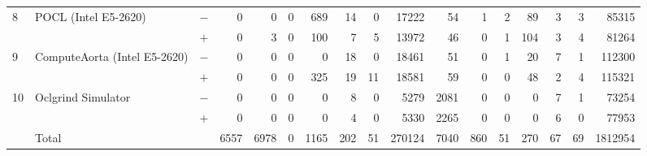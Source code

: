 \begin{tabular}{lll | rrrrrrr | rrrrrrr }
\hline
\multirow{ 2}{*}{8} & \multirow{ 2}{*}{POCL (Intel E5-2620)} & $-$ & 0 & 0 & 0 & 689 & 14 & 0 & 17222       & 54 & 1 & 2 & 89 & 3 & 3 & 85315 \\& & $+$ & 0 & 3 & 0 & 100 & 7 & 5 & 13972 & 46 & 0 & 1 & 104 & 3 & 4 & 81264 \\
\hline
\multirow{ 2}{*}{9} & \multirow{ 2}{*}{ComputeAorta (Intel E5-2620)} & $-$ & 0 & 0 & 0 & 0 & 18 & 0 & 18461       & 51 & 0 & 1 & 20 & 7 & 1 & 112300 \\& & $+$ & 0 & 0 & 0 & 325 & 19 & 11 & 18581 & 59 & 0 & 0 & 48 & 2 & 4 & 115321 \\
\hline
\multirow{ 2}{*}{10} & \multirow{ 2}{*}{Oclgrind Simulator} & $-$ & 0 & 0 & 0 & 0 & 8 & 0 & 5279       & 2081 & 0 & 0 & 0 & 7 & 1 & 73254 \\& & $+$ & 0 & 0 & 0 & 0 & 4 & 0 & 5330 & 2265 & 0 & 0 & 0 & 6 & 0 & 77953 \\
  \midrule
  
\multirow{ 2}{*}{} & \multirow{ 2}{*}{Total} & \multirow{ 2}{*}{} &
\multirow{ 2}{*}{6557} & \multirow{ 2}{*}{6978} & \multirow{ 2}{*}{0} & \multirow{ 2}{*}{1165} & \multirow{ 2}{*}{202} & \multirow{ 2}{*}{51} & \multirow{ 2}{*}{270124} & \multirow{ 2}{*}{7040} & \multirow{ 2}{*}{860} & \multirow{ 2}{*}{51} & \multirow{ 2}{*}{270} & \multirow{ 2}{*}{67} & \multirow{ 2}{*}{69} & \multirow{ 2}{*}{1812954} \\
\\

  \bottomrule
\end{tabular}

